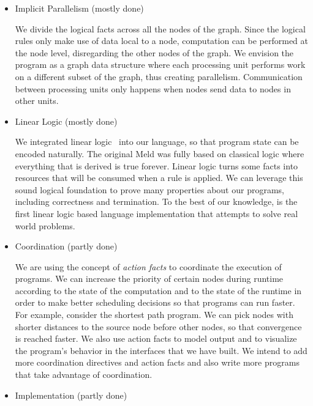 \begin{itemize}
   \item Implicit Parallelism (mostly done)
   
   We divide the logical facts across all the nodes of the graph. Since the
   logical rules only make use of data local to a node, computation can be performed at the
   node level, disregarding the other nodes of the graph. We envision the program as
   a graph data structure where each processing unit performs work on a different subset of the graph,
   thus creating parallelism. Communication between processing units only happens when nodes send data
   to nodes in other units.
   
   \item Linear Logic (mostly done)

   We integrated linear logic~\cite{Girard95logic:its} into our language, so that program state
   can be encoded naturally. The original Meld was fully based on classical logic where everything that
   is derived is true forever. Linear logic turns some facts into resources that will be consumed when a rule is applied. We can leverage this sound logical foundation to prove many properties about our programs, including correctness and termination. To the best of our knowledge, \lang is the first
   linear logic based language implementation that attempts to solve real world problems.

   \item Coordination (partly done)
   
   We are using the concept of \emph{action facts} to coordinate the execution of programs.
   We can increase the priority of certain nodes during runtime according to the state of the
   computation and to the state of the runtime in order to make better scheduling decisions
   so that programs can run faster.
   For example, consider the shortest path program. We can pick nodes with shorter
   distances to the source node before other nodes, so that convergence is reached faster.
   We also use action facts to model output and to visualize the program's behavior in the
   interfaces that we have built. We intend to add more coordination directives and action facts
   and also write more programs that take advantage of coordination.

   \item Implementation (partly done)


\end{itemize}
